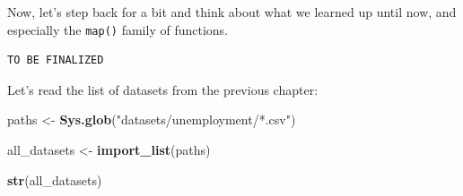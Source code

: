 \documentclass[]{gitbook}
\newenvironment{Shaded}{\begin{snugshade}}{\end{snugshade}}
\newcommand{\KeywordTok}[1]{\textcolor[rgb]{0.13,0.29,0.53}{\textbf{#1}}}
\newcommand{\NormalTok}[1]{#1}
\newcommand{\StringTok}[1]{\textcolor[rgb]{0.31,0.60,0.02}{#1}}
\begin{document}
Now, let's step back for a bit and think about what we learned up until now, and especially
the \texttt{map()} family of functions.

\begin{verbatim}
TO BE FINALIZED
\end{verbatim}

Let's read the list of datasets from the previous chapter:

\begin{Shaded}
\begin{Highlighting}[]
\NormalTok{paths <-}\StringTok{ }\KeywordTok{Sys.glob}\NormalTok{(}\StringTok{"datasets/unemployment/*.csv"}\NormalTok{)}

\NormalTok{all_datasets <-}\StringTok{ }\KeywordTok{import_list}\NormalTok{(paths)}

\KeywordTok{str}\NormalTok{(all_datasets)}
\end{Highlighting}
\end{Shaded}
\end{document}
